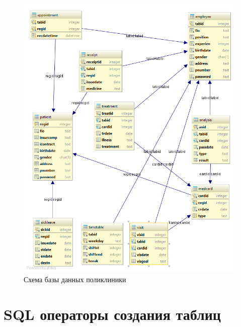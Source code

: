 \documentclass[14pt,a4paper,russian]{extreport}
\begin{document}
\begin{figure}[t!]
        \includegraphics[width=\textwidth]{clinic}
        \caption{Схема базы данных поликлиники}
        \label{fig:clinic}
\end{figure}
\vfill
\phantom{0}

\section{SQL операторы создания таблиц}
\setcounter{lstlisting}{0}





\newpage




\newpage



\end{document}

